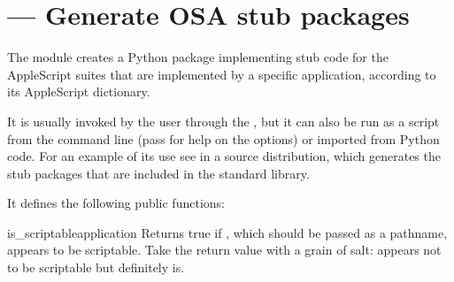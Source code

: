 \section{ ---
         Generate OSA stub packages}


The  module creates a Python package implementing
stub code for the AppleScript suites that are implemented by a specific
application, according to its AppleScript dictionary.

It is usually invoked by the user through the , but
it can also be run as a script from the command line (pass 
for help on the options) or imported from Python code. For an example of
its use see  in a source distribution,
which generates the stub packages that are included in the standard
library.

It defines the following public functions:

\begin{funcdesc}{is_scriptable}{application}
Returns true if , which should be passed as a pathname,
appears to be scriptable. Take the return value with a grain of salt:
 appears not to be scriptable but definitely is.
\end{funcdesc}

